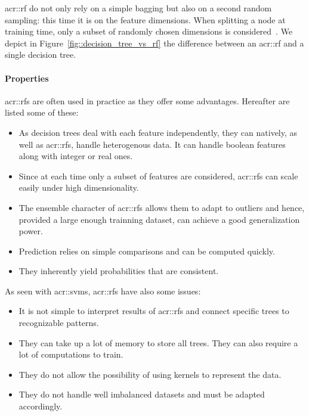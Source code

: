                 \gls{acr::rf} do not only rely on a simple bagging but also on a second random sampling: this time it is on the feature dimensions.
                When splitting a node at training time, only a subset of randomly chosen dimensions is considered~\parencite{breiman2001random}.
                We depict in Figure~\ref{fig::decision_tree_vs_rf} the difference between an \gls{acr::rf} and a single decision tree.

            \paragraph{Properties}
                \glspl{acr::rf} are often used in practice as they offer some advantages.
                Hereafter are listed some of these:
                \begin{itemize}
                    \item As decision trees deal with each feature independently, they can natively, as well as \glspl{acr::rf}, handle heterogenous data.
                        It can handle boolean features along with integer or real ones.
                    \item Since at each time only a subset of features are considered, \glspl{acr::rf} can scale easily under high dimensionality.
                    \item The ensemble character of \glspl{acr::rf} allows them to adapt to outliers and hence, provided a large enough trainning dataset, can achieve a good generalization power.
                    \item Prediction relies on simple comparisons and can be computed quickly.
                    \item They inherently yield probabilities that are consistent.
                \end{itemize}
                As seen with \glspl{acr::svm}, \glspl{acr::rf} have also some issues:
                \begin{itemize}
                    \item It is not simple to interpret results of \glspl{acr::rf} and connect specific trees to recognizable patterns.
                    \item They can take up a lot of memory to store all trees.
                            They can also require a lot of computations to train.
                    \item They do not allow the possibility of using kernels to represent the data.
                    \item They do not handle well imbalanced datasets and must be adapted accordingly.
                \end{itemize}
                
